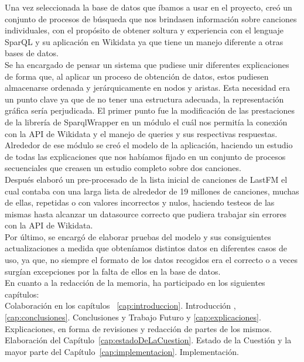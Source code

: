 Una vez seleccionada la base de datos que íbamos a usar en el proyecto, creó un conjunto de procesos de búsqueda que nos brindasen información sobre canciones individuales, con el propósito de obtener soltura y experiencia con el lenguaje SparQL y su aplicación en Wikidata ya que tiene un manejo diferente a otras bases de datos.\\

Se ha encargado de pensar un sistema que pudiese unir diferentes explicaciones de forma que, al aplicar un proceso de obtención de datos, estos pudiesen almacenarse ordenada y jerárquicamente en nodos y aristas. Esta necesidad era un punto clave ya que de no tener una estructura adecuada, la representación gráfica sería perjudicada. El primer punto fue la modificación de las prestaciones de la librería de SparqlWrapper en un módulo el cuál nos permitía la conexión con la API de Wikidata y el manejo de queries y sus respectivas respuestas. Alrededor de ese módulo se creó el modelo de la aplicación, haciendo un estudio de todas las explicaciones que nos habíamos fijado en un conjunto de procesos secuenciales que creasen un estudio completo sobre dos canciones.\\

Después elaboró un pre-procesado de la lista inicial de canciones de LastFM el cual contaba con una larga lista de alrededor de 19 millones de canciones, muchas de ellas, repetidas o con valores incorrectos y nulos, haciendo testeos de las mismas hasta alcanzar un datasource correcto que pudiera trabajar sin errores con la API de Wikidata.\\

Por último, se encargó de elaborar pruebas del modelo y sus consiguientes actualizaciones a medida que obteníamos distintos datos en diferentes casos de uso, ya que, no siempre el formato de los datos recogidos era el correcto o a veces surgían excepciones por la falta de ellos en la base de datos.\\

En cuanto a la redacción de la memoria, ha participado en los siguientes capítulos:\\

Colaboración en los capítulos ~\ref{cap:introduccion}. Introducción , \ref{cap:conclusiones}. Conclusiones y Trabajo Futuro y \ref{cap:explicaciones}. Explicaciones, en forma de revisiones y redacción de partes de los mismos.\\

Elaboración del Capítulo~\ref{cap:estadoDeLaCuestion}. Estado de la Cuestión y la mayor parte del Capítulo~\ref{cap:implementacion}. Implementación.


